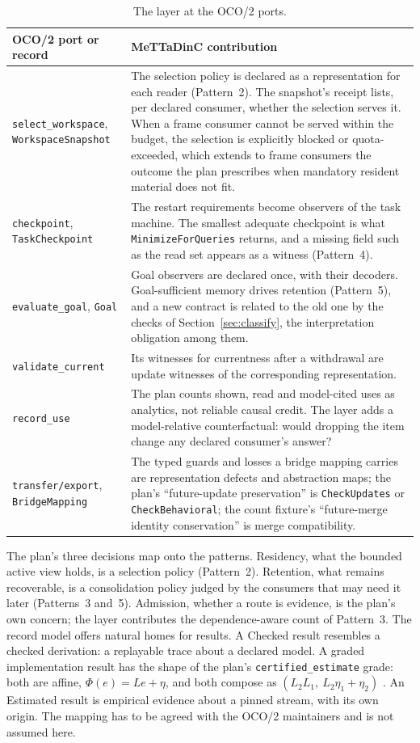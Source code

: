 \documentclass[11pt]{article}
\newcommand{\code}[1]{\texttt{#1}}
\theoremstyle{definition}
\theoremstyle{plain}
\begin{document}
\begin{table}[ht]
\centering\small
\begin{tabularx}{\textwidth}{>{\raggedright\arraybackslash}p{3.4cm}X}
\toprule
OCO/2 port or record & MeTTaDinC contribution\\
\midrule
\code{select\_workspace}, \code{WorkspaceSnapshot} & The selection policy is declared as a
representation for each reader (Pattern~2). The snapshot's receipt lists, per declared consumer,
whether the selection serves it. When a frame consumer cannot be served within the budget, the
selection is explicitly blocked or quota-exceeded, which extends to frame consumers the outcome the
plan prescribes when mandatory resident material does not fit.\\
\code{checkpoint}, \code{TaskCheckpoint} & The restart requirements become observers of the task
machine. The smallest adequate checkpoint is what \code{MinimizeForQueries} returns, and a missing
field such as the read set appears as a witness (Pattern~4).\\
\code{evaluate\_goal}, \code{Goal} & Goal observers are declared once, with their decoders.
Goal-sufficient memory drives retention (Pattern~5), and a new contract is related to the old one
by the checks of Section~\ref{sec:classify}, the interpretation obligation among them.\\
\code{validate\_current} & Its witnesses for currentness after a withdrawal are update witnesses of
the corresponding representation.\\
\code{record\_use} & The plan counts shown, read and model-cited uses as analytics, not reliable
causal credit. The layer adds a model-relative counterfactual: would dropping the item change any
declared consumer's answer?\\
\code{transfer/export}, \code{BridgeMapping} & The typed guards and losses a bridge mapping carries
are representation defects and abstraction maps; the plan's ``future-update preservation'' is
\code{CheckUpdates} or \code{CheckBehavioral}; the count fixture's ``future-merge identity
conservation'' is merge compatibility.\\
\bottomrule
\end{tabularx}
\caption{The layer at the OCO/2 ports.}\label{tab:ports}
\end{table}

The plan's three decisions map onto the patterns. Residency, what the bounded active view holds, is
a selection policy (Pattern~2). Retention, what remains recoverable, is a consolidation policy
judged by the consumers that may need it later (Patterns~3 and~5). Admission, whether a route is
evidence, is the plan's own concern; the layer contributes the dependence-aware count of
Pattern~3. The record model offers natural homes for results. A Checked result resembles a checked
derivation: a replayable trace about a declared model. A graded implementation result has the
shape of the plan's \code{certified\_estimate} grade: both are affine, $\Phi(e)=Le+\eta$, and both
compose as $(L_2L_1,\ L_2\eta_1+\eta_2)$ \cite[Section~9.3]{spec}. An Estimated result is empirical
evidence about a pinned stream, with its own origin. The mapping has to be agreed with the OCO/2
maintainers and is not assumed here.
\end{document}
